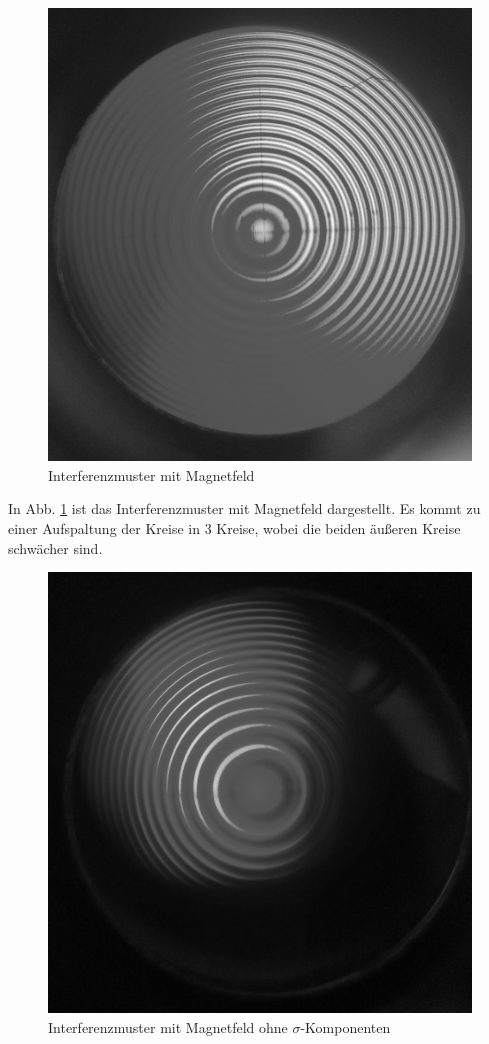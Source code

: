 \begin{figure}
\centering
\includegraphics[scale=0.1]{data/bilder_okular/bild_2_edit.jpg}
\caption{Interferenzmuster mit Magnetfeld}
\label{fig:bildtransmitB}
\end{figure}
In Abb. \ref{fig:bildtransmitB} ist das Interferenzmuster mit Magnetfeld dargestellt. Es kommt zu einer Aufspaltung der Kreise in 3 Kreise, wobei die beiden äußeren Kreise schwächer sind.\\
\begin{figure}
\centering
\includegraphics[scale=0.1]{data/bilder_okular/bild_3_edit.jpg}
\caption{Interferenzmuster mit Magnetfeld ohne $\sigma$-Komponenten}
\label{fig:bildtransmitBsigma}
\end{figure}

